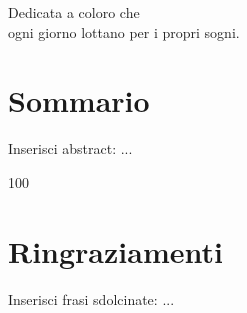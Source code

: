 \documentclass[a4paper,12pt,oneside]{book}
\newenvironment{dedication}
  {\clearpage           %
   \thispagestyle{empty}%
   \vspace*{\stretch{1}}%
   \itshape             %
   \raggedleft          %
  }
   {\par %
   \vspace{\stretch{3}} %
   \clearpage           %
  }
\begin{document}
\begin{dedication}
Dedicata a coloro che\\ ogni giorno lottano per i propri sogni.
\end{dedication}


\chapter*{Sommario} %
Inserisci abstract: ...


\tableofcontents








\begin{thebibliography}{100} %
\bibitem{[1]:}
\bibitem{[2]:}
\bibitem{[3]:}
\bibitem{[4]:}

\end{thebibliography}

\chapter*{Ringraziamenti}
Inserisci frasi sdolcinate: ...
\end{document}
